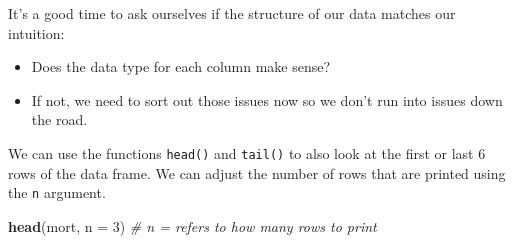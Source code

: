 \documentclass[
]{book}
\newenvironment{Shaded}{\begin{snugshade}}{\end{snugshade}}
\newcommand{\AttributeTok}[1]{\textcolor[rgb]{0.13,0.29,0.53}{#1}}
\newcommand{\CommentTok}[1]{\textcolor[rgb]{0.56,0.35,0.01}{\textit{#1}}}
\newcommand{\DecValTok}[1]{\textcolor[rgb]{0.00,0.00,0.81}{#1}}
\newcommand{\FunctionTok}[1]{\textcolor[rgb]{0.13,0.29,0.53}{\textbf{#1}}}
\newcommand{\NormalTok}[1]{#1}
\providecommand{\tightlist}{%
  \setlength{\itemsep}{0pt}\setlength{\parskip}{0pt}}
\begin{document}
It's a good time to ask ourselves if the structure of our data matches our intuition:

\begin{itemize}
\tightlist
\item
  Does the data type for each column make sense?
\item
  If not, we need to sort out those issues now so we don't run into issues down the road.
\end{itemize}

We can use the functions \texttt{head()} and \texttt{tail()} to also look at the first or last 6 rows of the data frame. We can adjust the number of rows that are printed using the \texttt{n} argument.

\begin{Shaded}
\begin{Highlighting}[]
\FunctionTok{head}\NormalTok{(mort, }\AttributeTok{n =} \DecValTok{3}\NormalTok{) }\CommentTok{\# n = refers to how many rows to print }
\end{Highlighting}
\end{Shaded}
\end{document}

